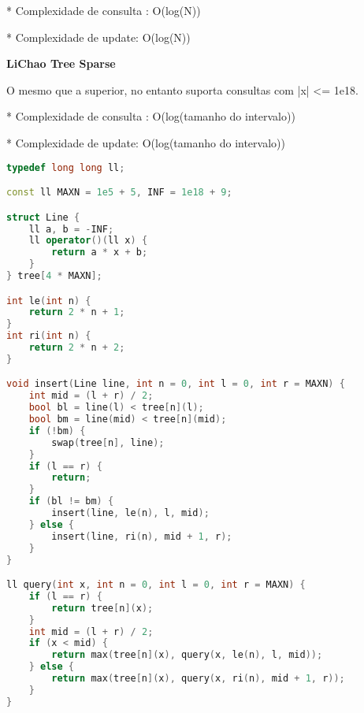 \documentclass[11pt, a4paper, oneside]{book}
\begin{document}
* Complexidade de consulta : O(log(N))

* Complexidade de update: O(log(N))



\textbf{LiChao Tree Sparse} 



O mesmo que a superior, no entanto suporta consultas com |x| <= 1e18.



* Complexidade de consulta : O(log(tamanho do intervalo))

* Complexidade de update: O(log(tamanho do intervalo))

\hfill

\begin{multicols}{2}
\begin{lstlisting}[language=C++]
typedef long long ll;

const ll MAXN = 1e5 + 5, INF = 1e18 + 9;

struct Line {
    ll a, b = -INF;
    ll operator()(ll x) {
        return a * x + b;
    }
} tree[4 * MAXN];

int le(int n) {
    return 2 * n + 1;
}
int ri(int n) {
    return 2 * n + 2;
}

void insert(Line line, int n = 0, int l = 0, int r = MAXN) {
    int mid = (l + r) / 2;
    bool bl = line(l) < tree[n](l);
    bool bm = line(mid) < tree[n](mid);
    if (!bm) {
        swap(tree[n], line);
    }
    if (l == r) {
        return;
    }
    if (bl != bm) {
        insert(line, le(n), l, mid);
    } else {
        insert(line, ri(n), mid + 1, r);
    }
}

ll query(int x, int n = 0, int l = 0, int r = MAXN) {
    if (l == r) {
        return tree[n](x);
    }
    int mid = (l + r) / 2;
    if (x < mid) {
        return max(tree[n](x), query(x, le(n), l, mid));
    } else {
        return max(tree[n](x), query(x, ri(n), mid + 1, r));
    }
}
\end{lstlisting}
\end{multicols}

\hfill
\end{document}
